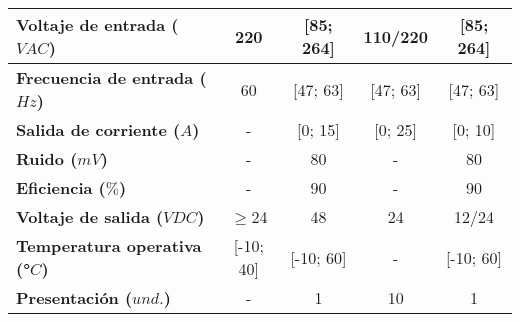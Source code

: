 \begin{savenotes}
\begin{mytable}[H]
\begin{tabular}{l|c|c|c|c|}
			\multicolumn{1}{|l|}{
				\begin{minipage}{\myforthmaxsizeofcontenttable}	
					\textbf{Voltaje de entrada ($VAC$)}
				\end{minipage}
			} & 220 & [85; 264] & 110/220 & [85; 264] \\ \hline			
		
			\multicolumn{1}{|l|}{
				\begin{minipage}{\myforthmaxsizeofcontenttable}	
					\textbf{Frecuencia de entrada ($Hz$)}
				\end{minipage}
			} & 60 & [47; 63] & [47; 63] & [47; 63] \\ \hline
		
			\multicolumn{1}{|l|}{
				\begin{minipage}{\myforthmaxsizeofcontenttable}	
					\textbf{Salida de corriente ($A$)}
				\end{minipage}
			} & - & [0; 15] & [0; 25] & [0; 10] \\ \hline

			\multicolumn{1}{|l|}{
				\begin{minipage}{\myforthmaxsizeofcontenttable}	
					\textbf{Ruido ($mV$)}
				\end{minipage}
			} & - & 80 & - & 80 \\ \hline
		
			\multicolumn{1}{|l|}{
				\begin{minipage}{\myforthmaxsizeofcontenttable}	
					\textbf{Eficiencia ($\%$)}
				\end{minipage}
			} & - & 90 & - & 90 \\ \hline
		
			\multicolumn{1}{|l|}{
				\begin{minipage}{\myforthmaxsizeofcontenttable}	
					\textbf{Voltaje de salida ($VDC$)}
				\end{minipage}
			} & $\geq$24 & 48 & 24 & 12/24 \\ \hline
		
			\multicolumn{1}{|l|}{
				\begin{minipage}{\myforthmaxsizeofcontenttable}	
					\textbf{Temperatura operativa (°$C$)}
				\end{minipage}
			} & [-10; 40] & [-10; 60] & - & [-10; 60] \\ \hline
		
			\multicolumn{1}{|l|}{
				\begin{minipage}{\myforthmaxsizeofcontenttable}	
					\textbf{Presentación ($und.$)}
				\end{minipage}
			} & - & 1 & 10 & 1 \\ \hline
		

\end{tabular}
\end{mytable}
\end{savenotes}
